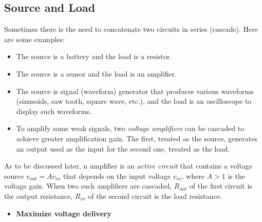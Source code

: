 \begin{itemize}
\begin{comment}
{\bf Answer:}
\[
V_s\frac{1}{R_s+1}=9.09,\;\;\;\;\;\;V_s\frac{2}{R_s+2}=9.52
\]
i.e.,
\[
V_s=9.09\,R_s+9.09,\;\;\;\;\;\;\;V_s=4.76\,R_s+9.52
\]
Subtracting we get 
\[
R_s=\frac{9.52-9.09}{9.09-4.76}=\frac{0.43}{4.33}\approx 0.1\;k\Omega
\]
and 
\[
V_s=9.09\,R_s+9.09=9.09\times 0.1+9.09=10\,V
\]

\end{comment}


\subsection*{Source and Load}

Sometimes there is the need to concatenate two circuits in series
(cascade). Here are some examples: 
\begin{itemize}
\item The source is a battery and the load is a resistor.
\item The source is a sensor and the load is an amplifier.
\item The source is signal (waveform) generator that produces various
  waveforms (sinusoids, saw tooth, square wave, etc.), and the load is 
  an oscilloscope to display such waveforms. 
\item To amplify some weak signals, two {\em voltage amplifiers} can 
  be cascaded to achieve greater amplification gain. The first, treated 
  as the source, generates an output used as the input for the second 
  one, treated as the load.
\end{itemize}

As to be discussed later, n amplifier is an {\em active circuit} that
contains a voltage source $v_{out}=Av_{in}$ that depends on the input 
voltage $v_{in}$, where $A>1$ is the voltage gain. When two such
amplifiers are cascaded, $R_{out}$ of the first circuit is the output 
resistance, $R_{in}$ of the second circuit is the load resistance.


\begin{itemize}
\item {\bf Maximize voltage delivery}



\end{itemize}
\end{itemize}
